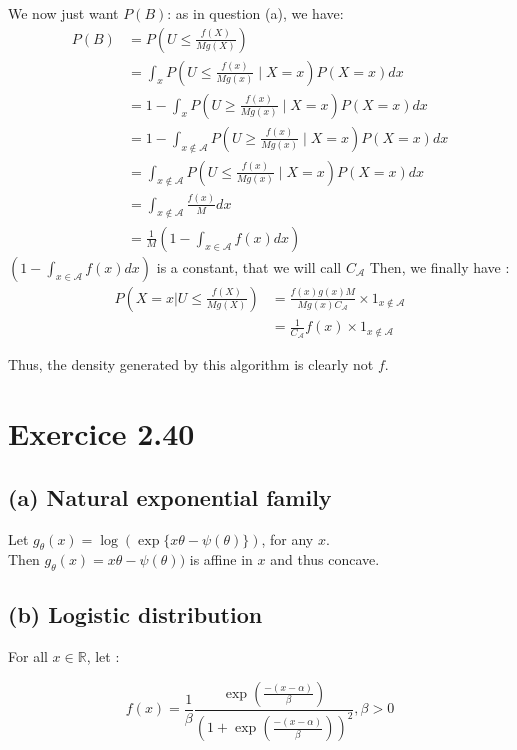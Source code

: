 \documentclass{article}
\newcommand{\R}{\mathbb R}
\begin{document}
We now just want $P(B)$: as in question (a), we have:
\begin{align*}
    P(B) &= P \left (  U \leq  \frac{f(X)}{Mg(X)} \right )  \\
    &= \int_x P \left (  U \leq  \frac{f(x)}{Mg(x)} \mid X=x \right )  P(X=x) dx \\
    &=1 - \int_x P \left (  U \geq  \frac{f(x)}{Mg(x)} \mid X=x \right )  P(X=x) dx \\
    &=1 - \int_{x \notin \mathcal{A}} P \left (  U \geq  \frac{f(x)}{Mg(x)} \mid X=x \right )  P(X=x) dx \\
    &= \int_{x \notin \mathcal{A}} P \left (  U \leq  \frac{f(x)}{Mg(x)} \mid X=x \right )  P(X=x) dx \\
    &= \int_{x \notin \mathcal{A}} \frac{f(x)}{M}dx \\
    &= \frac{1}{M}\left (1-\int_{x \in \mathcal{A}} f(x)dx \right)
\end{align*}
$\left (1-\int_{x \in \mathcal{A}} f(x)dx \right)$ is a constant, that we will call $C_{\mathcal{A}}$
Then, we finally have : 
\begin{align*}
P \left (  X = x | U \leq \frac{f(X)}{Mg(X)} \right ) &= \frac{f(x)g(x)M}{Mg(x)C_{\mathcal{A}}} \times 1_{x \notin \mathcal{A}} \\
    &= \frac{1}{C_{\mathcal{A}}} f(x) \times 1_{x \notin \mathcal{A}}  
\end{align*}

Thus, the density generated by this algorithm is clearly not $f$. 

 

\section*{Exercice 2.40}
\subsection*{(a) Natural exponential family}
Let $g_{\theta}(x) = \log (\exp \{x\theta - \psi(\theta) \})$, for any $x$.  \\
Then $g_{\theta}(x) = x\theta - \psi(\theta) )$ is affine in $x$ and thus
concave.

\subsection*{(b) Logistic distribution}
For all $x \in \R$, let :

\[
    f(x) = \frac{1}{\beta} \frac{\exp (\frac{-(x-\alpha)}{\beta})}
    {(1+ \exp (\frac{-(x -\alpha)}{\beta}) )^2}, \beta >0 
\]
\end{document}
